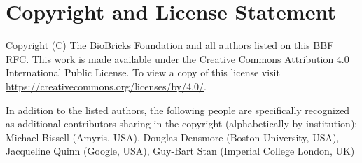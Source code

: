 \section{Copyright and License Statement}


Copyright (C) The BioBricks Foundation and all authors listed on this BBF RFC. This work is made available under the Creative Commons Attribution 4.0 International Public License. To view a copy of this license visit \href{https://creativecommons.org/licenses/by/4.0/}{https://creativecommons.org/licenses/by/4.0/}.

In addition to the listed authors, the following people are specifically recognized as additional contributors sharing in the copyright (alphabetically by institution):
Michael Bissell	(Amyris, USA),
Douglas Densmore (Boston University, USA), 
Jacqueline Quinn (Google, USA),
Guy-Bart Stan (Imperial College London, UK)